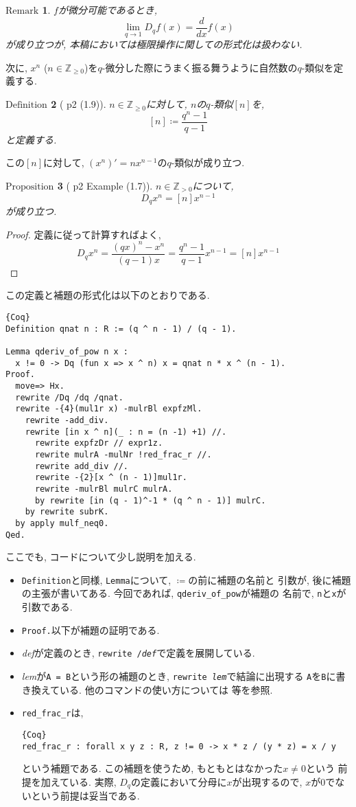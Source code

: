 \documentclass[11pt]{jarticle}
\theoremstyle{mystyle}
\newtheorem{df}{$\textrm{Definition}$}[subsubsection]
\newtheorem{prop}[df]{$\textrm{Proposition}$}
\newtheorem{rmk}[df]{$\textrm{Remark}$}
\newcommand{\bdf}{\begin{shadebox} \begin{df}}
\newcommand{\edf}{\end{df} \end{shadebox}}
\newcommand{\bprop}{\begin{shadebox} \begin{prop}}
\newcommand{\eprop}{\end{prop} \end{shadebox}}
\newcommand{\brmk}{\begin{rmk}}
\newcommand{\ermk}{\end{rmk}}
\newcommand{\bpf}{\begin{proof}}
\newcommand{\epf}{\end{proof}}
\newcommand{\Z}{\mathbb{Z}}
\newcommand{\ra}{\rightarrow}
\newcommand{\0}{\textbf{0}}
\newcommand{\1}{\textbf{1}}
\newcommand{\2}{\textbf{2}}
\begin{document}
\brmk
  $f$が微分可能であるとき, 
  \[
    \lim_{q\ra1} D_qf(x) = \frac{d}{dx}f(x)
  \] 
  が成り立つが, 本稿においては極限操作に関しての形式化は扱わない. 
\ermk
次に, $x ^ n$ ($n \in \Z_{\ge 0}$)を$q$-微分した際にうまく振る舞うように自然数の$q$-類似を定義する. 
\bdf[\cite{Kac} p2 (1.9)]
  $n \in \Z_{\ge 0}$に対して, $n$の$q$-類似$[n]$を, 
  \[
    [n] \coloneqq \frac{q^n - 1}{q - 1}
  \]
  と定義する. 
\edf
この$[n]$に対して, $(x^n)' = n x^{n-1}$の$q$-類似が成り立つ.
\bprop[\cite{Kac} p2 Example (1.7)]
  $n \in \Z_{>0}$について, 
  \[
    D_q x^n = [n] x ^{n - 1}
  \]
  が成り立つ. 
\eprop
\bpf
  定義に従って計算すればよく, 
  \[
    D_q x ^ n = \frac{(qx) ^ n - x ^ n}{(q - 1) x}
                 = \frac{q^n - 1}{q - 1} x ^ {n - 1}
                 = [n] x ^ {n - 1}
  \] 
\epf
この定義と補題の形式化は以下のとおりである. 
\begin{lstlisting}{Coq}
Definition qnat n : R := (q ^ n - 1) / (q - 1).

Lemma qderiv_of_pow n x :
  x != 0 -> Dq (fun x => x ^ n) x = qnat n * x ^ (n - 1).
Proof.
  move=> Hx.
  rewrite /Dq /dq /qnat.
  rewrite -{4}(mul1r x) -mulrBl expfzMl.
    rewrite -add_div.
    rewrite [in x ^ n](_ : n = (n -1) +1) //.
      rewrite expfzDr // expr1z.
      rewrite mulrA -mulNr !red_frac_r //.
      rewrite add_div //.
      rewrite -{2}[x ^ (n - 1)]mul1r.
      rewrite -mulrBl mulrC mulrA.
      by rewrite [in (q - 1)^-1 * (q ^ n - 1)] mulrC.
    by rewrite subrK.
  by apply mulf_neq0.
Qed.
\end{lstlisting}
ここでも, コードについて少し説明を加える. 
\begin{itemize}
  \item {\tt Definition}と同様, {\tt Lemma}について, {\tt $\coloneqq$}の前に補題の名前と
          引数が, 後に補題の主張が書いてある. 今回であれば, {\tt qderiv\_of\_pow}が補題の
          名前で, {\tt n}と{\tt x}が引数である. 
  \item {\tt Proof.}以下が補題の証明である. 
  \item {\it def}が定義のとき, {\tt rewrite /{\it def}}で定義を展開している. 
  \item {\it lem}が{\tt A = B}という形の補題のとき, {\tt rewrite {\it lem}}で結論に出現する
          {\tt A}を{\tt B}に書き換えている. 他のコマンドの使い方については \cite{Gar}等を参照. 
  \item {\tt red\_frac\_r}は, 
           \begin{lstlisting}{Coq}
red_frac_r : forall x y z : R, z != 0 -> x * z / (y * z) = x / y \end{lstlisting}
           という補題である. この補題を使うため, もともとはなかった{\tt $x \ne 0$}という
           前提を加えている. 実際, $D_q$の定義において分母に$x$が出現するので, 
           $x$が$0$でないという前提は妥当である.  
\end{itemize}
\end{document}
